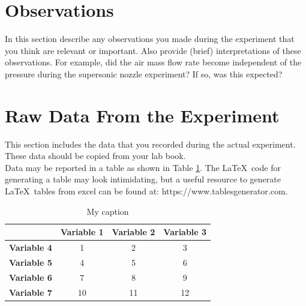 \documentclass[12pt,letterpaper]{article}       %
\begin{document}
\section{Observations}

In this section describe any observations you made during the experiment that you think are relevant or important. Also provide (brief) interpretations of these observations. For example, did the air mass flow rate become independent of the pressure during the supersonic nozzle experiment? If so, was this expected?


\section{Raw Data From the Experiment}

This section includes the data that you recorded during the actual experiment. These data should be copied from your lab book.\\ 

Data may be reported in a table as shown in Table \ref{table_lable}.  
The \LaTeX\ code for generating a table may look intimidating, but a useful resource to generate \LaTeX\ tables from excel can be found at: https://www.tablesgenerator.com.
\begin{table}[h]
\centering
\caption{My caption}
\label{table_lable}
\begin{tabular}{c|ccc}
  & \textbf{Variable 1} & \textbf{Variable 2} & \textbf{Variable 3} \\
 \hline
\textbf{Variable 4} & 1 & 2 & 3 \\
\textbf{Variable 5} & 4 & 5 & 6 \\
\textbf{Variable 6} & 7 & 8 & 9 \\
\textbf{Variable 7} & 10 & 11 & 12
\end{tabular}
\end{table}

\end{document}

